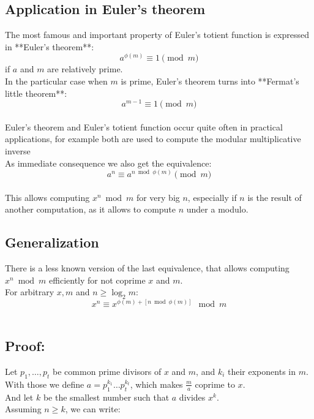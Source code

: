 \subsection*{Application in Euler's theorem}

The most famous and important property of Euler's totient function is expressed in **Euler's theorem**: \\
$$a^{\phi(m)} \equiv 1 \pmod m$$ if $a$ and $m$ are relatively prime.\\

In the particular case when $m$ is prime, Euler's theorem turns into **Fermat's little theorem**:\\
$$a^{m - 1} \equiv 1 \pmod m$$\\

Euler's theorem and Euler's totient function occur quite often in practical applications, for example both are used to compute the modular multiplicative inverse\\

As immediate consequence we also get the equivalence:\\
$$a^n \equiv a^{n \bmod \phi(m)} \pmod m$$\\
This allows computing $x^n \bmod m$ for very big $n$, especially if $n$ is the result of another computation, as it allows to compute $n$ under a modulo.\\

\subsection*{Generalization}

There is a less known version of the last equivalence, that allows computing $x^n \bmod m$ efficiently for not coprime $x$ and $m$.\\
For arbitrary $x, m$ and $n \geq \log_2 m$:\\
$$x^{n}\equiv x^{\phi(m)+[n \bmod \phi(m)]} \mod m$$\\

\subsection*{Proof:}

Let $p_1, \dots, p_t$ be common prime divisors of $x$ and $m$, and $k_i$ their exponents in $m$.\\
With those we define $a = p_1^{k_1} \dots p_t^{k_t}$, which makes $\frac{m}{a}$ coprime to $x$.\\
And let $k$ be the smallest number such that $a$ divides $x^k$.\\
Assuming $n \ge k$, we can write:\\

